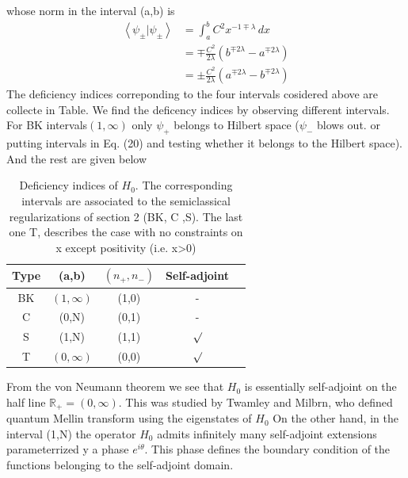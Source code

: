 \documentclass[12pt, letterpaper]{article}
\newcommand*{\1}{\hspace{1pt}}
\begin{document}
        whose norm in the interval (a,b) is
        \begin{equation}
            \begin{split}
            \left\langle \psi_{\pm} | \psi_{\pm} \right\rangle &= \int_{a}^{b} C^{2} x^{-1\mp \lambda} \,dx \\
            &= \mp \frac{C^{2}}{2\lambda}\left(b^{\mp 2\lambda} - a^{\mp 2\lambda}\right) \\  
            &= \pm \frac{C^{2}}{2\lambda}\left(a^{\mp 2\lambda} - b^{\mp 2\lambda}\right) 
            \end{split}
        \end{equation}
        The deficiency indices correponding to the four intervals cosidered above are collecte in Table\cite{s8}. We find the deficency indices by observing different intervals.
        For BK intervals$(1,\infty)$ only $\psi_{+}$ belongs to Hilbert space ($\psi_{-}$ blows out. or putting intervals in Eq. (20) and testing whether it belongs to
        the Hilbert space)\cite{s7}. And the rest are given below
        
        \begin{longtable}[c]{c c c c c}
            \caption{Deficiency indices of $H_{0}$. The corresponding intervals are associated to the semiclassical regularizations of section 2 (BK, C ,S).
            The last one T, describes the case with no constraints on x except positivity (i.e. x>0)} \\
            \hline
             Type & (a,b) & $(n_{+}, n_{-})$ & Self-adjoint\\
             \hline 
             BK & $(1,\infty)$ & (1,0) & -\\  
             C & (0,N) & (0,1) &  -\\ 
             S & (1,N) & (1,1) & $\surd$ \\ 
             T & $(0,\infty)$ & (0,0) & $\surd $\\ 
            \hline
        \end{longtable}


        From the von Neumann theorem we see that $H_{0}$ is essentially self-adjoint on the half line $\mathbb{R} _{+} = (0, \infty)$. This was studied by Twamley and Milbrn, who
        defined quantum Mellin transform using the eigenstates of $H_{0}$\cite{s9}
        On the other hand, in the interval (1,N) the operator $H_{0}$ admits infinitely many self-adjoint extensions parameterrized y a phase $e^{i\theta}$. This phase defines the 
        boundary condition of the functions belonging to the self-adjoint domain.\cite{s7}
\end{document}
